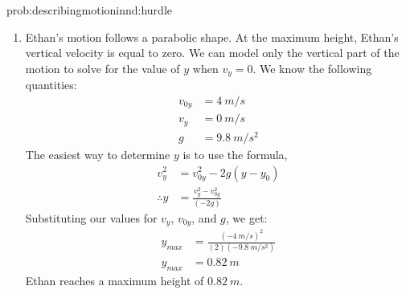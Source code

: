 \begin{solution}{prob:describingmotioninnd:hurdle}
\begin{enumerate}[label=\alph*)]
We can re-arrange the equation for $y(t)$ and solve the resulting quadratic for $t$ (we get two solutions):
\begin{align*}
0&=-\frac{1}{2}gt^2+v_{0y}t-h\\
0&=\frac{1}{2}(\SI{-9.8}{m/s^2})t^2+(\SI{4}{m/s})t-\SI{0.5}{m}\\
t&=\SI{0.15}{s},\quad \SI{0.66}{s}
\end{align*}
The jump will be a parabola, and Ethan will cross a height of $\SI{0.5}{m}$ twice, once on the way up, and once on the way down. We want to know when Ethan reaches $\SI{0.5}{m}$ for the first time (on the way up), so we choose $t=\SI{0.15}{s}$. The horizontal displacement at this time is:
\begin{align*}
x&=v_xt\\
&=(\SI{3}{m/s})(\SI{0.15}{s})\\
&=\SI{0.45}{m}
\end{align*}
Therefore, he can get as close as $\SI{0.45}{m}$ from the hurdle before he has to jump, if his initial horizontal velocity is $\SI{3}{m/s}$.
\item Ethan's motion follows a parabolic shape. At the maximum height, Ethan's vertical velocity is equal to zero. We can model only the vertical part of the motion to solve for the value of $y$ when $v_y=0$. We know the following quantities:
\begin{align*}
v_{0y}&=\SI{4}{m/s}\\
v_y&=\SI{0}{m/s}\\
g&=\SI{9.8}{m/s^2}
\end{align*}
The easiest way to determine $y$ is to use the formula, 
\begin{align*}
v_y^2&=v_{0y}^2-2g(y-y_0)\\
\therefore y&=\frac{v_y^2-v_{0y}^2}{(-2g)}
\end{align*}
Substituting our values for $v_y$, $v_{0y}$, and $g$, we get:
\begin{align*}
y_{max}&=\frac{(\SI{-4}{m/s})^2}{(2)(\SI{-9.8}{m/s^2})}\\
y_{max}&=\SI{0.82}{m}
\end{align*}
Ethan reaches a maximum height of $\SI{0.82}{m}$. 

\end{enumerate}
\end{solution}

